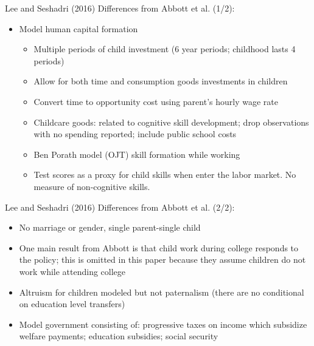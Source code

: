 \documentclass{beamer}
\begin{document}
\begin{frame}{Lee and Seshadri (2016)}
Differences from Abbott et al. (1/2): 
\begin{itemize}
\item Model human capital formation
\begin{itemize}
\item Multiple periods of child investment (6 year periods; childhood lasts 4 periods) 
\hyperlink{lstime}{}
\item Allow for both time and consumption goods investments in children
\item Convert time to opportunity cost using parent's hourly wage rate
\item Childcare goods: related to cognitive skill development; drop observations with no spending reported; include public school costs
\item Ben Porath model (OJT) skill formation while working 
\item Test scores as a proxy for child skills when enter the labor market. No measure of non-cognitive skills.
\end{itemize}
\end{itemize}
\end{frame}

\begin{frame}{Lee and Seshadri (2016)}
Differences from Abbott et al. (2/2): 
\begin{itemize}
\item No marriage or gender, single parent-single child
\item One main result from Abbott is that child work during college responds to the policy; this is omitted in this paper because they assume children do not work while attending college
\item Altruism for children modeled but not paternalism (there are no conditional on education level transfers)
\item Model government consisting of: progressive taxes on income which subsidize welfare payments; education subsidies; social security 
\end{itemize}

\end{frame}

\end{document}
